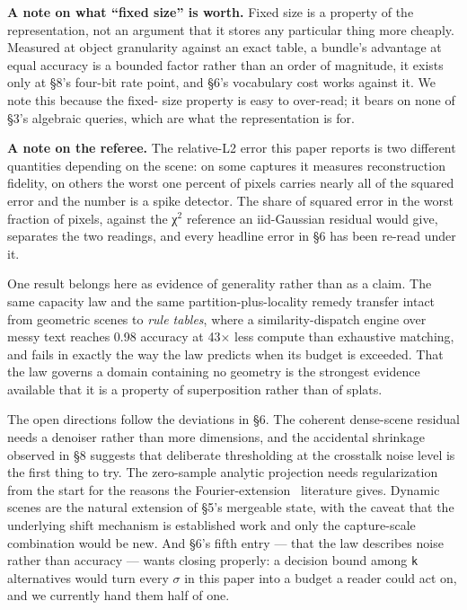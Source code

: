 \documentclass[11pt]{article}
\begin{document}
\textbf{A note on what ``fixed size'' is worth.} Fixed size is a
property of the representation, not an argument that it stores any
particular thing more cheaply. Measured at object granularity against an
exact table, a bundle's advantage at equal accuracy is a bounded factor
rather than an order of magnitude, it exists only at \S8's four-bit rate
point, and \S6's vocabulary cost works against it. We note this because
the fixed- size property is easy to over-read; it bears on none of \S3's
algebraic queries, which are what the representation is for.

\textbf{A note on the referee.} The relative-L2 error this paper reports
is two different quantities depending on the scene: on some captures it
measures reconstruction fidelity, on others the worst one percent of
pixels carries nearly all of the squared error and the number is a spike
detector. The share of squared error in the worst fraction of pixels,
against the χ$^2$ reference an iid-Gaussian residual would give,
separates the two readings, and every headline error in \S6 has been
re-read under it.

One result belongs here as evidence of generality rather than as a
claim. The same capacity law and the same partition-plus-locality remedy
transfer intact from geometric scenes to \emph{rule tables}, where a
similarity-dispatch engine over messy text reaches 0.98 accuracy at
43$\times$ less compute than exhaustive matching, and fails in exactly
the way the law predicts when its budget is exceeded. That the law
governs a domain containing no geometry is the strongest evidence
available that it is a property of superposition rather than of splats.

The open directions follow the deviations in \S6. The coherent
dense-scene residual needs a denoiser rather than more dimensions, and
the accidental shrinkage observed in \S8 suggests that deliberate
thresholding at the crosstalk noise level is the first thing to try. The
zero-sample analytic projection needs regularization from the start for
the reasons the Fourier-extension~\cite{adcock2012fourier} literature
gives. Dynamic scenes are the natural extension of \S5's mergeable
state, with the caveat that the underlying shift mechanism is
established work and only the capture-scale combination would be new.
And \S6's fifth entry --- that the law describes noise rather than
accuracy --- wants closing properly: a decision bound among \texttt{k}
alternatives would turn every $\sigma$ in this paper into a budget a
reader could act on, and we currently hand them half of one.
\end{document}
